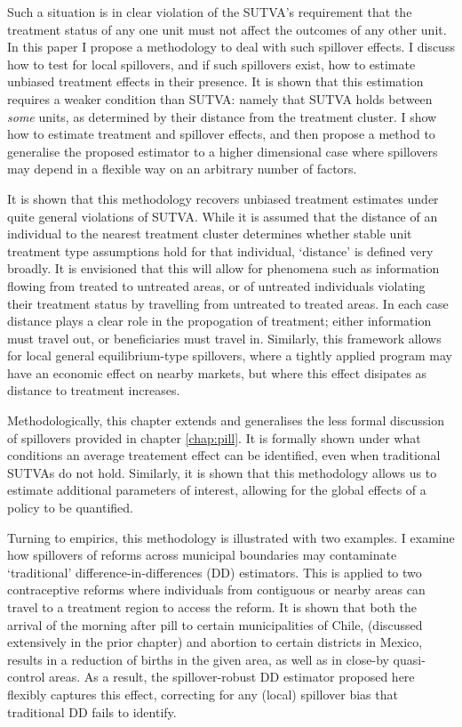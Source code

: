 Such a situation is in clear violation of the SUTVA's requirement that the 
treatment status of any one unit must not affect the outcomes of any other unit.  
In this paper I propose a methodology to deal with such spillover effects.  I
discuss how to test for local spillovers, and if such spillovers exist, how to 
estimate unbiased treatment effects in their presence.  It is shown that this 
estimation requires a weaker condition than SUTVA: namely that SUTVA holds 
between \emph{some} units, as determined by their distance from the treatment 
cluster.  I show how to estimate treatment and spillover effects, and then
propose a method to generalise the proposed estimator to a higher dimensional 
case where spillovers may depend in a flexible way on an arbitrary number of 
factors.

It is shown that this methodology recovers unbiased treatment estimates under 
quite general violations of SUTVA.  While it is assumed that the distance of 
an individual to the nearest treatment cluster determines whether stable unit 
treatment type assumptions hold for that individual, `distance' is defined 
very broadly.  It is envisioned that this will allow for phenomena such as 
information flowing from treated to untreated areas, or of untreated 
individuals violating their treatment status by travelling from untreated to
treated areas.  In each case distance plays a clear role in the propogation 
of treatment; either information must travel out, or beneficiaries must travel 
in. Similarly, this framework allows for local general equilibrium-type 
spillovers, where a tightly applied program may have an economic effect on 
nearby markets, but where this effect disipates as distance to treatment 
increases.

Methodologically, this chapter extends and generalises the less formal 
discussion of spillovers provided in chapter \ref{chap:pill}.  It is
formally shown under what conditions an average treatement effect can 
be identified, even when traditional SUTVAs do not hold.  Similarly, it is 
shown that this methodology allows us to estimate additional parameters
of interest, allowing for the global effects of a policy to be quantified.

Turning to empirics, this methodology is illustrated with two examples.
I examine how spillovers of reforms across municipal boundaries may 
contaminate `traditional' difference-in-differences (DD) estimators. This is 
applied to two contraceptive reforms where individuals from contiguous or nearby 
areas can travel to a treatment region to access the reform.  It is shown that 
both the arrival of the morning after pill to certain municipalities of Chile, 
(discussed extensively in the prior chapter) and abortion to certain districts 
in Mexico, results in a reduction of births in the given area, as well as in 
close-by quasi-control areas.  As a result, the spillover-robust DD estimator 
proposed here flexibly captures this effect,  correcting for any (local) 
spillover bias that traditional DD fails to identify.

